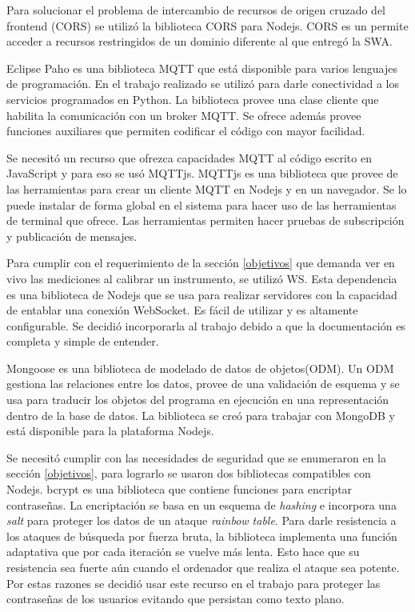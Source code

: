 Para solucionar el problema de intercambio de recursos de origen cruzado del frontend (CORS) se utilizó la biblioteca CORS para Nodejs.
CORS es un permite acceder a recursos restringidos de un dominio diferente al que entregó la SWA.

Eclipse Paho es una biblioteca MQTT que está disponible para varios lenguajes de programación.
En el trabajo realizado se utilizó para darle conectividad a los servicios programados en Python.
La biblioteca provee una clase cliente que habilita la comunicación con un broker MQTT.
Se ofrece además provee funciones auxiliares que permiten codificar el código con mayor facilidad.

Se necesitó un recurso que ofrezca capacidades MQTT al código escrito en JavaScript y para eso se usó MQTTjs.
MQTTjs es una biblioteca que provee de las herramientas para crear un cliente MQTT en Nodejs y en un navegador.
Se lo puede instalar de forma global en el sistema para hacer uso de las herramientas de terminal que ofrece.
Las herramientas permiten hacer pruebas de subscripción y publicación de mensajes.

Para cumplir con el requerimiento de la sección \ref{objetivos} que demanda ver en vivo las mediciones al calibrar un instrumento, se utilizó WS. 
Esta dependencia es una biblioteca de Nodejs que se usa para realizar servidores con la capacidad de entablar una conexión WebSocket.
Es fácil de utilizar y es altamente configurable.
Se decidió incorporarla al trabajo debido a que la documentación es completa y simple de entender.

Mongoose es una biblioteca de modelado de datos de objetos(ODM).
Un ODM gestiona las relaciones entre los datos, provee de una validación de esquema y se usa para traducir los objetos del programa en ejecución en una representación dentro de la base de datos.
La biblioteca se creó para trabajar con MongoDB y está disponible para la plataforma Nodejs.

Se necesitó cumplir con las necesidades de seguridad que se enumeraron en la sección \ref{objetivos}, para lograrlo se usaron dos bibliotecas compatibles con Nodejs.
bcrypt es una biblioteca que contiene funciones para encriptar contraseñas.
La encriptación se basa en un esquema de \emph{hashing} e incorpora una \emph{salt} para proteger los datos de un ataque \emph{rainbow table}.
Para darle resistencia a los ataques de búsqueda por fuerza bruta, la biblioteca implementa una función adaptativa que por cada iteración se vuelve más lenta.
Esto hace que su resistencia sea fuerte aún cuando el ordenador que realiza el ataque sea potente.
Por estas razones se decidió usar este recurso en el trabajo para proteger las contraseñas de los usuarios evitando que persistan como texto plano.

